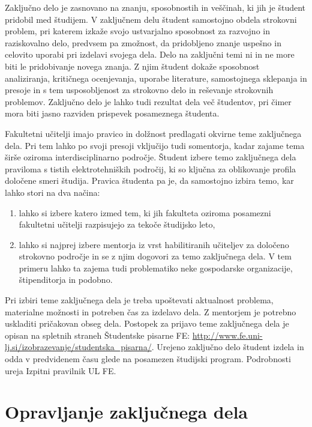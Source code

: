 \documentclass[a4paper,twoside,openright,12pt,slovene]{book}
\begin{document}
Zaključno delo je zasnovano na znanju, sposobnostih in veščinah, ki jih je študent pridobil med študijem. V zaključnem delu študent samostojno obdela strokovni problem, pri katerem izkaže svojo ustvarjalno sposobnost za razvojno in raziskovalno delo, predvsem pa zmožnost, da pridobljeno znanje uspešno in celovito uporabi pri izdelavi svojega dela. Delo na zaključni temi ni in ne more biti le pridobivanje novega znanja. Z njim študent dokaže sposobnost analiziranja, kritičnega ocenjevanja, uporabe literature, samostojnega sklepanja in presoje in s tem usposobljenost za strokovno delo in reševanje strokovnih problemov. Zaključno delo je lahko tudi rezultat dela več študentov, pri čimer mora biti jasno razviden prispevek posameznega študenta.

Fakultetni učitelji imajo pravico in dolžnost predlagati okvirne teme zaključnega dela. Pri tem lahko po svoji presoji vključijo tudi somentorja, kadar zajame tema širše oziroma interdisciplinarno področje. Študent izbere temo zaključnega dela praviloma s tistih elektrotehniških področij, ki so ključna za oblikovanje profila določene smeri študija. Pravica študenta pa je, da samostojno izbira temo, kar lahko stori na dva načina:
\begin{enumerate}[noitemsep]
    \item lahko si izbere katero izmed tem, ki jih fakulteta oziroma posamezni fakultetni učitelji razpisujejo za tekoče študijsko leto,
    \item lahko si najprej izbere mentorja iz vrst habilitiranih učiteljev za določeno strokovno področje in se z njim dogovori za temo zaključnega dela. V tem primeru lahko ta zajema tudi problematiko neke gospodarske organizacije, štipenditorja in podobno.
\end{enumerate}

Pri izbiri teme zaključnega dela je treba upoštevati aktualnost problema, materialne možnosti in potreben čas za izdelavo dela. Z mentorjem je potrebno uskladiti pričakovan obseg dela. Postopek za prijavo teme zaključnega dela je opisan na spletnih straneh Študentske pisarne FE: \url{http://www.fe.uni-lj.si/izobrazevanje/studentska\_pisarna/}. Urejeno zaključno delo študent izdela in odda v predvidenem času glede na posamezen študijski program. Podrobnosti ureja Izpitni pravilnik UL FE.

\chapter{Opravljanje zaključnega dela} \label{opravljanje_naloge}
\end{document}
